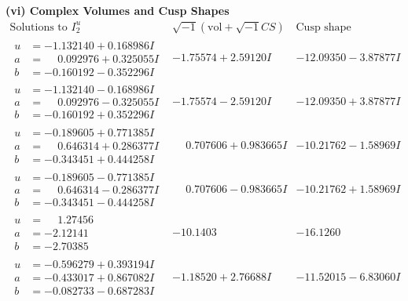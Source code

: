 \documentclass[1p]{elsarticle_modified}
\theoremstyle{definition}
\newcommand{\I}{\sqrt{-1}}
\begin{document}
\newpage\flushleft \textbf{(vi) Complex Volumes and Cusp Shapes}
$$\begin{array}{c|c|c}  
\text{Solutions to }I^u_{2}& \I (\text{vol} + \sqrt{-1}CS) & \text{Cusp shape}\\
 \hline 
\begin{aligned}
u &= -1.132140 + 0.168986 I \\
a &= \phantom{-}0.092976 + 0.325055 I \\
b &= -0.160192 - 0.352296 I\end{aligned}
 & -1.75574 + 2.59120 I & -12.09350 - 3.87877 I \\ \hline\begin{aligned}
u &= -1.132140 - 0.168986 I \\
a &= \phantom{-}0.092976 - 0.325055 I \\
b &= -0.160192 + 0.352296 I\end{aligned}
 & -1.75574 - 2.59120 I & -12.09350 + 3.87877 I \\ \hline\begin{aligned}
u &= -0.189605 + 0.771385 I \\
a &= \phantom{-}0.646314 + 0.286377 I \\
b &= -0.343451 + 0.444258 I\end{aligned}
 & \phantom{-}0.707606 + 0.983665 I & -10.21762 - 1.58969 I \\ \hline\begin{aligned}
u &= -0.189605 - 0.771385 I \\
a &= \phantom{-}0.646314 - 0.286377 I \\
b &= -0.343451 - 0.444258 I\end{aligned}
 & \phantom{-}0.707606 - 0.983665 I & -10.21762 + 1.58969 I \\ \hline\begin{aligned}
u &= \phantom{-}1.27456\phantom{ +0.000000I} \\
a &= -2.12141\phantom{ +0.000000I} \\
b &= -2.70385\phantom{ +0.000000I}\end{aligned}
 & -10.1403\phantom{ +0.000000I} & -16.1260\phantom{ +0.000000I} \\ \hline\begin{aligned}
u &= -0.596279 + 0.393194 I \\
a &= -0.433017 + 0.867082 I \\
b &= -0.082733 - 0.687283 I\end{aligned}
 & -1.18520 + 2.76688 I & -11.52015 - 6.83060 I \\ \hline\begin{aligned}

\end{aligned}
\end{array}$$
\end{document}
